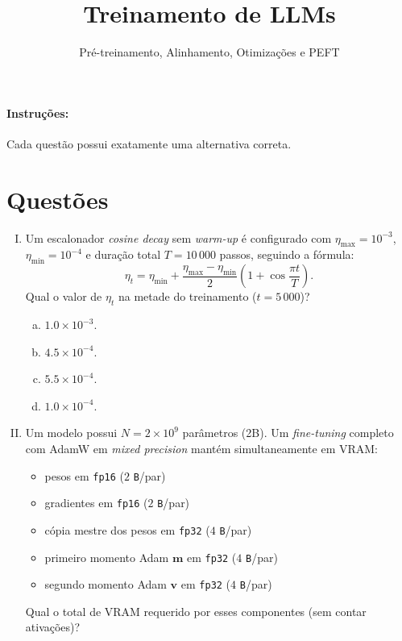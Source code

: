 \documentclass{dlproblemset}
\title{Treinamento de LLMs}
\subtitle{Pré-treinamento, Alinhamento, Otimizações e PEFT}
\begin{document}
\paragraph{Instruções:} Cada questão possui exatamente uma alternativa correta.

\section*{Questões}

\begin{enumerate}[I)]

\item Um escalonador \textit{cosine decay} sem \textit{warm-up} é configurado com
      $\eta_{\max} = 10^{-3}$, $\eta_{\min} = 10^{-4}$ e duração total
      $T = 10\,000$ passos, seguindo a fórmula:
      \[
        \eta_t = \eta_{\min} + \frac{\eta_{\max}-\eta_{\min}}{2}\!\left(1+\cos\frac{\pi t}{T}\right).
      \]
      Qual o valor de $\eta_t$ na metade do treinamento ($t = 5\,000$)?

\begin{enumerate}[a)]
    \item $1.0 \times 10^{-3}$.
    \item $4.5 \times 10^{-4}$.
    \item $5.5 \times 10^{-4}$.
    \item $1.0 \times 10^{-4}$.
\end{enumerate}

\item Um modelo possui $N = 2 \times 10^9$ parâmetros (2B). Um
      \textit{fine-tuning} completo com AdamW em \textit{mixed precision}
      mantém simultaneamente em VRAM:
      \begin{itemize}
        \item pesos em \texttt{fp16} ($2$ \texttt{B}/par)
        \item gradientes em \texttt{fp16} ($2$ \texttt{B}/par)
        \item cópia mestre dos pesos em \texttt{fp32} ($4$ \texttt{B}/par)
        \item primeiro momento Adam $\mathbf{m}$ em \texttt{fp32} ($4$ \texttt{B}/par)
        \item segundo momento Adam $\mathbf{v}$ em \texttt{fp32} ($4$ \texttt{B}/par)
      \end{itemize}
      Qual o total de VRAM requerido por esses componentes (sem contar ativações)?


\end{enumerate}
\end{document}
